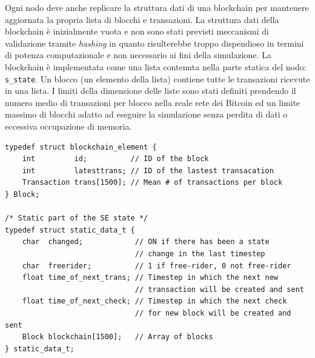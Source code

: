 Ogni nodo deve anche replicare la struttura dati di una blockchain per mantenere aggiornata la propria lista di blocchi e transazioni. La struttura dati della blockchain è inizialmente vuota e non sono stati previsti meccanismi di validazione tramite \textit{hashing} in quanto risulterebbe troppo dispendioso in termini di potenza computazionale e non necessario ai fini della simulazione. La blockchain è implementata come una lista contenuta nella parte statica del nodo: \texttt{s\_state}. Un blocco (un elemento della lista) contiene tutte le transazioni ricevute in una lista. I limiti della dimensione delle liste sono stati definiti prendendo il numero medio di transazioni per blocco nella reale rete dei Bitcoin ed un limite massimo di blocchi adatto ad eseguire la simulazione senza perdita di dati o eccessiva occupazione di memoria.
\begin{code}
\begin{verbatim}
typedef struct blockchain_element {
    int         id;          // ID of the block
    int         latesttrans; // ID of the lastest transacation
    Transaction trans[1500]; // Mean # of transactions per block
} Block;

/* Static part of the SE state */
typedef struct static_data_t {
    char  changed;            // ON if there has been a state
                              // change in the last timestep
    char  freerider;          // 1 if free-rider, 0 not free-rider
    float time_of_next_trans; // Timestep in which the next new
                              // transaction will be created and sent
    float time_of_next_check; // Timestep in which the next check
                              // for new block will be created and sent
    Block blockchain[1500];   // Array of blocks
} static_data_t;
\end{verbatim}


\end{code}
